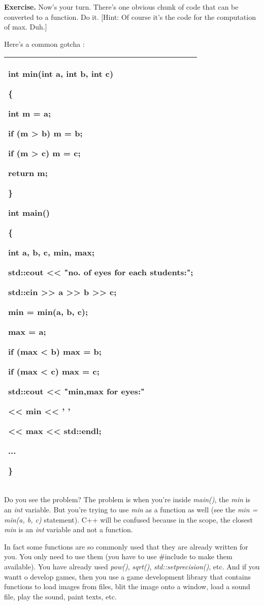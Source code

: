 \documentclass[
]{article}
\begin{document}
\textbf{Exercise.} Now's your turn. There's one obvious chunk of code
that can be converted to a function. Do it. {[}Hint: Of course it's the
code for the computation of max. Duh.{]}

Here's a common gotcha :

\begin{longtable}[]{@{}l@{}}
\toprule
\endhead
\begin{minipage}[t]{0.97\columnwidth}\raggedright
int min(int a, int b, int c)

\{

int m = a;

if (m \textgreater{} b) m = b;

if (m \textgreater{} c) m = c;

return m;

\}

int main()

\{

int a, b, c, min, max;

std::cout \textless\textless{} "no. of eyes for each students:";

std::cin \textgreater\textgreater{} a \textgreater\textgreater{} b
\textgreater\textgreater{} c;

\textbf{min = min(a, b, c);}

max = a;

if (max \textless{} b) max = b;

if (max \textless{} c) max = c;

std::cout \textless\textless{} "min,max for eyes:"

\textless\textless{} min \textless\textless{} ' '

\textless\textless{} max \textless\textless{} std::endl;

...

\}\strut
\end{minipage}\tabularnewline
\bottomrule
\end{longtable}

Do you see the problem? The problem is when you're inside \emph{main()},
the \emph{min} is an \emph{int} variable. But you're trying to use
\emph{min} as a function as well (see the \emph{min = min(a, b, c)}
statement). C++ will be confused because in the scope, the closest
\emph{min} is an \emph{int} variable and not a function.

In fact some functions are so commonly used that they are already
written for you. You only need to use them (you have to use \#include to
make them available). You have already used \emph{pow()}, \emph{sqrt()},
\emph{std::setprecision()}, etc. And if you wantt o develop games, then
you use a game development library that contains functions to load
images from files, blit the image onto a window, load a sound file, play
the sound, paint texts, etc.
\end{document}
